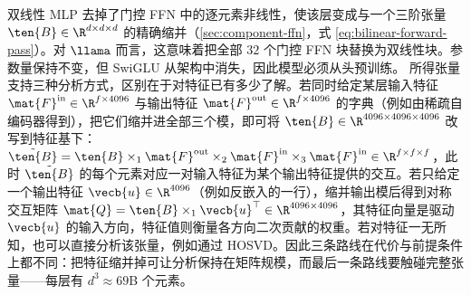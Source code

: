 双线性 MLP \cite{pearce2025bilinearmlp} 去掉了门控 FFN 中的逐元素非线性，使该层变成与一个三阶张量 $\ten{B} \in \R^{d \times d \times d}$ 的精确缩并（\cref{sec:component-ffn}，式 \eqref{eq:bilinear-forward-pass}）。对 $\llama$ 而言，这意味着把全部 $32$ 个门控 FFN 块替换为双线性块。参数量保持不变，但 SwiGLU 从架构中消失，因此模型必须从头预训练。
所得张量支持三种分析方式，区别在于对特征已有多少了解。若同时给定某层输入特征 $\mat{F}^{\rm in} \in \R^{f\times 4096}$ 与输出特征 $\mat{F}^{\rm out} \in \R^{f\times 4096}$ 的字典（例如由稀疏自编码器得到），把它们缩并进全部三个模，即可将 $\ten{B} \in \R^{4096 \times 4096 \times 4096}$ 改写到特征基下：$\tilde{\ten{B}} = \ten{B} \times_1 \mat{F}^{\rm out} \times_2 \mat{F}^{\rm in} \times_3 \mat{F}^{\rm in} \in \R^{f \times f \times f}$，此时 $\tilde{\ten{B}}$ 的每个元素对应一对输入特征为某个输出特征提供的交互。若只给定一个输出特征 $\vecb{u} \in \R^{4096}$（例如反嵌入的一行），缩并输出模后得到对称交互矩阵 $\mat{Q} = \ten{B} \times_1 \vecb{u}^\top \in \R^{4096 \times 4096}$，其特征向量是驱动 $\vecb{u}$ 的输入方向，特征值则衡量各方向二次贡献的权重。若对特征一无所知，也可以直接分析该张量，例如通过 HOSVD。因此三条路线在代价与前提条件上都不同：把特征缩并掉可让分析保持在矩阵规模，而最后一条路线要触碰完整张量——每层有 $d^3 \approx 69$B 个元素。



